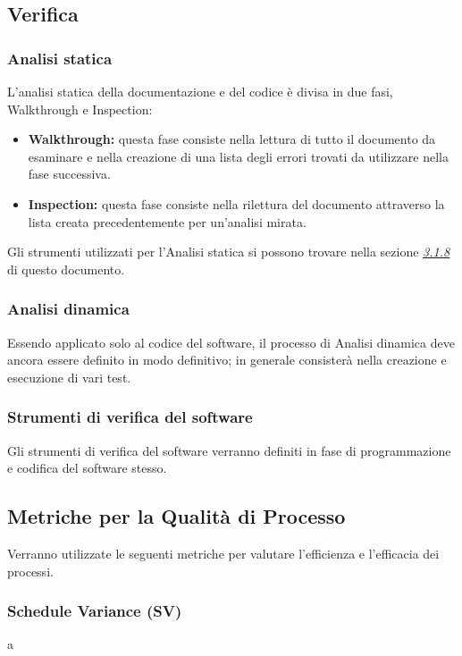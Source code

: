 	\subsection{Verifica}
		\subsubsection{Analisi statica}
			L'analisi statica della documentazione e del codice è divisa in due fasi, Walkthrough e Inspection:
			\begin{itemize}
				\item \textbf{Walkthrough:} questa fase consiste nella lettura di tutto il documento da esaminare e nella creazione di una lista degli errori trovati da utilizzare nella fase successiva.
				\item \textbf{Inspection:} questa fase consiste nella rilettura del documento attraverso la lista creata precedentemente per un'analisi mirata. \newline
			\end{itemize}
		Gli strumenti utilizzati per l'Analisi statica si possono trovare nella sezione \hyperref[3.1.8]{\textit{\underline{3.1.8}}} di questo documento.\newline
		\subsubsection{Analisi dinamica}
			Essendo applicato solo al codice del software, il processo di Analisi dinamica deve ancora essere definito in modo definitivo; in generale consisterà nella creazione e esecuzione di vari test.\newline
		\subsubsection{Strumenti di verifica del software}
		Gli strumenti di verifica del software verranno definiti in fase di programmazione e codifica del software stesso.\newline
		
	\subsection{Metriche per la Qualità di Processo}
	Verranno  utilizzate  le  seguenti  metriche  per  valutare  l’efficienza  e  l’efficacia  dei processi. \newline
	 	\subsubsection{Schedule Variance (SV)} a\newline
